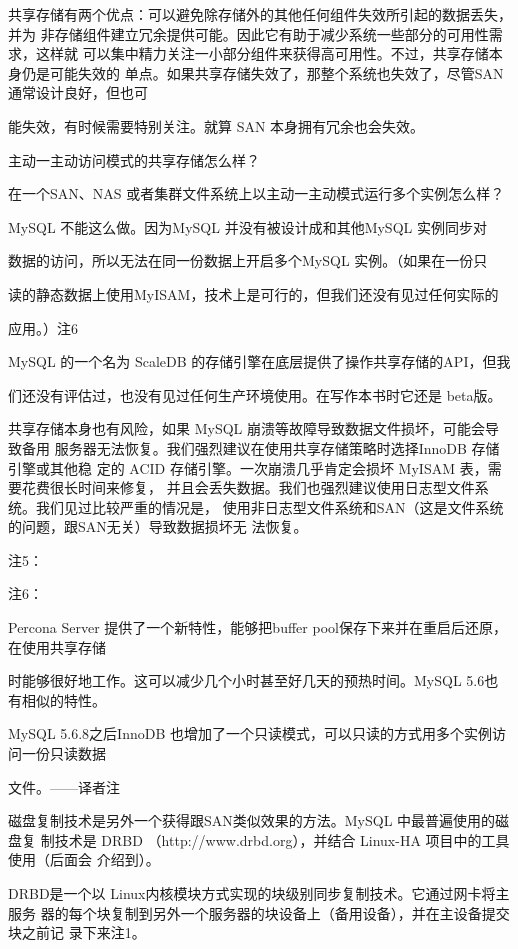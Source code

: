 共享存储有两个优点：可以避免除存储外的其他任何组件失效所引起的数据丢失，并为
非存储组件建立冗余提供可能。因此它有助于减少系统一些部分的可用性需求，这样就
可以集中精力关注一小部分组件来获得高可用性。不过，共享存储本身仍是可能失效的
单点。如果共享存储失效了，那整个系统也失效了，尽管SAN通常设计良好，但也可

能失效，有时候需要特别关注。就算 SAN 本身拥有冗余也会失效。

主动一主动访问模式的共享存储怎么样？

在一个SAN、NAS 或者集群文件系统上以主动一主动模式运行多个实例怎么样？

MySQL 不能这么做。因为MySQL 并没有被设计成和其他MySQL 实例同步对

数据的访问，所以无法在同一份数据上开启多个MySQL 实例。（如果在一份只

读的静态数据上使用MyISAM，技术上是可行的，但我们还没有见过任何实际的

应用。）注6

MySQL 的一个名为 ScaleDB 的存储引擎在底层提供了操作共享存储的API，但我

们还没有评估过，也没有见过任何生产环境使用。在写作本书时它还是 beta版。

共享存储本身也有风险，如果 MySQL 崩溃等故障导致数据文件损坏，可能会导致备用
服务器无法恢复。我们强烈建议在使用共享存储策略时选择InnoDB 存储引擎或其他稳
定的 ACID 存储引擎。一次崩溃几乎肯定会损坏 MyISAM 表，需要花费很长时间来修复，
并且会丢失数据。我们也强烈建议使用日志型文件系统。我们见过比较严重的情况是，
使用非日志型文件系统和SAN（这是文件系统的问题，跟SAN无关）导致数据损坏无
法恢复。

注5：

注6：

Percona Server 提供了一个新特性，能够把buffer pool保存下来并在重启后还原，在使用共享存储

时能够很好地工作。这可以减少几个小时甚至好几天的预热时间。MySQL 5.6也有相似的特性。

MySQL 5.6.8之后InnoDB 也增加了一个只读模式，可以只读的方式用多个实例访问一份只读数据

文件。——译者注

磁盘复制技术是另外一个获得跟SAN类似效果的方法。MySQL 中最普遍使用的磁盘复
制技术是 DRBD （http://www.drbd.org），并结合 Linux-HA 项目中的工具使用（后面会
介绍到）。

DRBD是一个以 Linux内核模块方式实现的块级别同步复制技术。它通过网卡将主服务
器的每个块复制到另外一个服务器的块设备上（备用设备），并在主设备提交块之前记
录下来注1。

